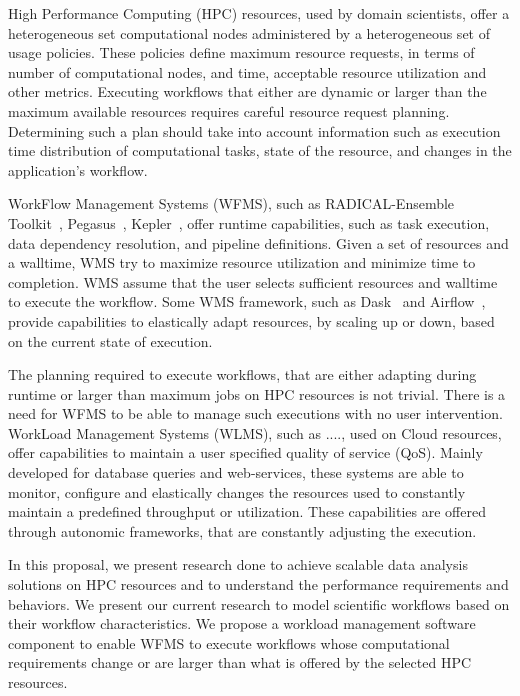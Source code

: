 High Performance Computing (HPC) resources, used by domain scientists, offer a heterogeneous set computational nodes administered by a heterogeneous set of usage policies. These policies define maximum resource requests, in terms of number of computational nodes, and time, acceptable resource utilization and other metrics. Executing workflows that either are dynamic or larger than the maximum available resources requires careful resource request planning. Determining such a plan should take into account information such as execution time distribution of computational tasks, state of the resource, and changes in the application's workflow.


WorkFlow Management Systems (WFMS), such as RADICAL-Ensemble Toolkit~\cite{balasubramanian2018harnessing}, Pegasus~\cite{deelman2015pegasus}, Kepler~\cite{ludascher2006concurrency}, offer runtime capabilities, such as task execution, data dependency resolution, and pipeline definitions. Given a set of resources and a walltime, WMS try to maximize resource utilization and minimize time to completion. WMS assume that the user selects sufficient resources and walltime to execute the workflow. Some WMS framework, such as Dask~\cite{rocklin2015dask} and Airflow~\cite{airflow}, provide capabilities to elastically adapt resources, by scaling up or down, based on the current state of execution.

The planning required to execute workflows, that are either adapting during runtime or larger than maximum jobs on HPC resources is not trivial. There is a need for WFMS to be able to manage such executions with no user intervention. WorkLoad Management Systems (WLMS), such as ...., used on Cloud resources, offer capabilities to maintain a user specified quality of service (QoS). Mainly developed for database queries and web-services, these systems are able to monitor, configure and elastically changes the resources used to constantly maintain a predefined throughput or utilization. These capabilities are offered through autonomic frameworks, that are constantly adjusting the execution.

In this proposal, we present research done to achieve scalable data analysis solutions on HPC resources and to understand the performance requirements and behaviors. We present our current research to model scientific workflows based on their workflow characteristics. We propose a workload management software component to enable WFMS to execute workflows whose computational requirements change or are larger than what is offered by the selected HPC resources.



